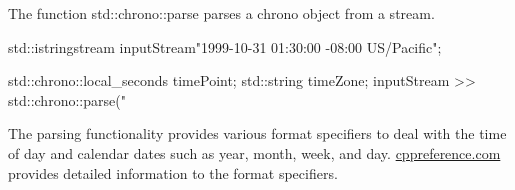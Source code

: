 
The function std::chrono::parse parses a chrono object from a stream.


\begin{cpp}
std::istringstream inputStream{"1999-10-31 01:30:00 -08:00 US/Pacific"};

std::chrono::local_seconds timePoint;
std::string timeZone;
inputStream >> std::chrono::parse("%
\end{cpp}

The parsing functionality provides various format specifiers to deal with the time of day and calendar dates such as year, month, week, and day. \href{https://en.cppreference.com/w/cpp/chrono/parse}{cppreference.com} provides detailed information to the format specifiers.





















